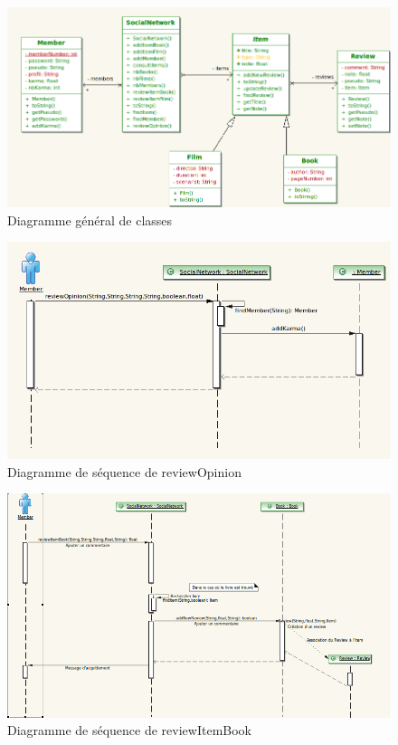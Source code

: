 \documentclass[12pt,a4paper]{report}
\begin{document}
\begin{figure}[h]
\centering
\includegraphics[angle = 90, scale=0.85]{Classe1.png}
\caption{Diagramme général de classes}
\label{fig:diagClasses1}
\end{figure}

\begin{figure}[h]
\centering
\includegraphics[angle = 90, scale=0.85]{Sequence1.png}
\caption{Diagramme de séquence de reviewOpinion}
\label{fig:diagSeq1}
\end{figure}


\begin{figure}[h]
\centering
\includegraphics[angle = 90, scale=0.85]{Sequence2.png}
\caption{Diagramme de séquence de reviewItemBook}
\label{fig:diagSeq2}
\end{figure}
\end{document}

